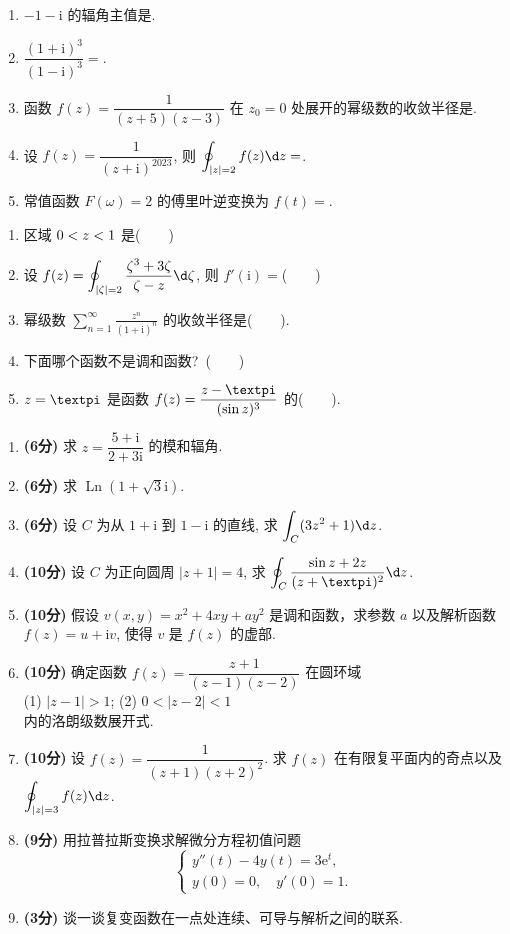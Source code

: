 \documentclass[simple]{hfutexam}
\DeclareMathOperator{\Ln}{Ln}
\let\Re\relax\DeclareMathOperator{\Re}{Re}
\newcommand{\ii}{\mathrm{i}}
\newcommand{\ee}{\mathrm{e}}
\newcommand{\cpi}{{\text{\textpi}}}
\newcommand{\dint}{\displaystyle\int}
\newcommand{\doint}{\displaystyle\oint}
\newcommand{\sumf}[1]{\displaystyle\sum_{n=#1}^{\infty}}
\begin{document}
\begin{enumerate}
  \item $-1-\ii$ 的辐角主值是\fillblank{}.
  \item $\dfrac{(1+\ii)^3}{(1-\ii)^3}=$\fillblank{}.
  \item 函数 $f(z)=\dfrac1{(z+5)(z-3)}$ 在 $z_0=0$ 处展开的幂级数的收敛半径是\fillblank[25mm]{}.
  \item 设 $f(z)=\dfrac1{(z+\ii)^{2023}}$, 则 $\doint_{|z|=2}f(z)\d z=$\fillblank{}.
  \item 常值函数 $F(\omega)=2$ 的傅里叶逆变换为 $f(t)=$\fillblank{}.
\end{enumerate}

\begin{enumerate}
  \item 区域 $0<\Re z<1$ 是(~~~~)
  \item 设 $f(z)=\doint_{|\zeta|=2}\dfrac{\zeta^3+3\zeta}{\zeta-z}\d\zeta$, 则 $f'(\ii)=$(~~~~)
  \xx{$0$}{$3\ii$}{$-3\ii$}{$2\ii $}
  \item 幂级数 $\sumf1 \frac{z^n}{(1+\ii)^n}$ 的收敛半径是(~~~~).
  \item 下面哪个函数不是调和函数?~(~~~~)
  \item $z=\cpi$ 是函数 $f(z)=\dfrac{z-\cpi}{(\sin z)^3}$ 的(~~~~).
\end{enumerate}


\begin{enumerate}
  \item \textbf{(6分)} 求 $z=\dfrac{5+\ii}{2+3\ii}$ 的模和辐角.
  \item \textbf{(6分)} 求 $\Ln(1+\sqrt3\ii)$.
  \item \textbf{(6分)} 设 $C$ 为从 $1+\ii$ 到 $1-\ii$ 的直线, 求 $\dint_C (3z^2+1) \d z$.
  \item \textbf{(10分)} 设 $C$ 为正向圆周 $|z+1|=4$, 求 $\doint_C\frac{\sin z+2z}{(z+\cpi)^2}\d z$.
  \item \textbf{(10分)} 假设 $v(x,y)=x^2+4xy+ay^2$ 是调和函数，求参数 $a$ 以及解析函数 $f(z)=u+\ii v$, 使得 $v$ 是 $f(z)$ 的虚部.
  \item \textbf{(10分)} 确定函数 $f(z)=\dfrac{z+1}{(z-1)(z-2)}$ 在圆环域\\
\indent (1) $|z-1|>1$; \hspace{2em} (2) $0<|z-2|<1$\\
内的洛朗级数展开式.
  \item \textbf{(10分)} 设 $f(z)=\dfrac{1}{(z+1)(z+2)^2}$. 求 $f(z)$ 在有限复平面内的奇点以及 $\doint_{|z|=3}f(z)\d z$.
  \item \textbf{(9分)} 用拉普拉斯变换求解微分方程初值问题
\[\begin{cases}
y''(t)-4y(t)=3\ee^t,\\
y(0)=0,\quad y'(0)=1.
\end{cases}\]
  \item \textbf{(3分)} 谈一谈复变函数在一点处连续、可导与解析之间的联系.
\end{enumerate}
\end{document}
